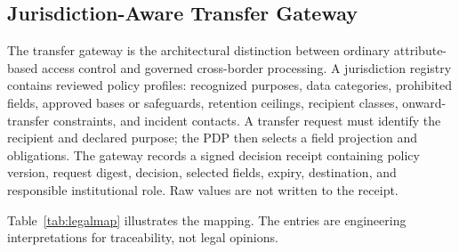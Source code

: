 \documentclass[journal]{IEEEtran}
\begin{document}
\subsection{Jurisdiction-Aware Transfer Gateway}
The transfer gateway is the architectural distinction between ordinary attribute-based access control and governed cross-border processing. A jurisdiction registry contains reviewed policy profiles: recognized purposes, data categories, prohibited fields, approved bases or safeguards, retention ceilings, recipient classes, onward-transfer constraints, and incident contacts. A transfer request must identify the recipient and declared purpose; the PDP then selects a field projection and obligations. The gateway records a signed decision receipt containing policy version, request digest, decision, selected fields, expiry, destination, and responsible institutional role. Raw values are not written to the receipt.

Table~\ref{tab:legalmap} illustrates the mapping. The entries are engineering interpretations for traceability, not legal opinions.
\end{document}
